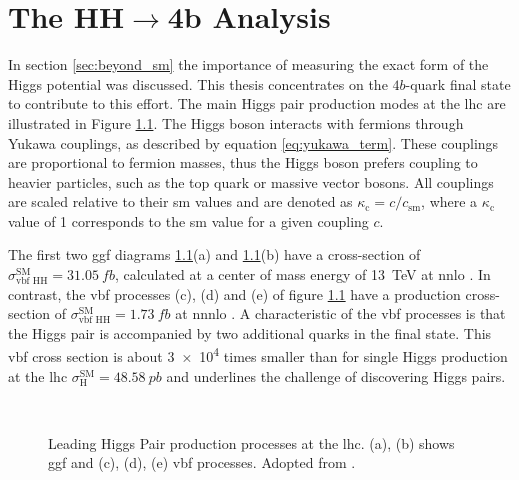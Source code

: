 \chapter{The HH$\rightarrow$4b Analysis}\label{ch:hh4b}

In section \ref{sec:beyond_sm} the importance of measuring the exact form of the Higgs potential was discussed. This thesis concentrates on the $4b$-quark final state to contribute to this effort. The main Higgs pair production modes at the \ac{lhc} are illustrated in Figure \ref{fig:main_production_processes}. The Higgs boson interacts with fermions through Yukawa couplings, as described by equation \ref{eq:yukawa_term}. These couplings are proportional to fermion masses, thus the Higgs boson prefers coupling to heavier particles, such as the top quark or massive vector bosons. All couplings are scaled relative to their \ac{sm} values and are denoted as $\kappa_\mathrm{c} = c/c_\mathrm{sm}$, where a $\kappa_\mathrm{c}$ value of 1 corresponds to the \ac{sm} value for a given coupling $c$.

The first two \ac{ggf} diagrams \ref{fig:main_production_processes}(a) and \ref{fig:main_production_processes}(b) have a cross-section of $\sigma_\text{vbf HH}^\text{SM}=\qty[]{31.05}{fb}$, calculated at a center of mass energy of \qty[]{13}{TeV} at \ac{nnlo} \citep{Grazzini_2018}. In contrast, the \ac{vbf} processes (c), (d) and (e) of figure \ref{fig:main_production_processes} have a production cross-section of
$\sigma_\text{vbf HH}^\text{SM}=\qty[]{1.73}{fb}$ at \ac{nnnlo} \citep{PhysRevD.98.114016}. A characteristic of the \ac{vbf} processes is that the Higgs pair is accompanied by two additional quarks in the final state. This \ac{vbf} cross section is about \qty[]{3e4}{} times smaller than for single Higgs production at the \ac{lhc} $\sigma_\text{H}^\text{SM}=\qty[]{48.58}{pb}$ \citep{de2016arxiv} and underlines the challenge of discovering Higgs pairs.

\begin{figure}
    \centering
    \hspace{.06\textwidth}
     \\
    \hspace{.01\textwidth}
    \hspace{.01\textwidth}
    \caption[]{Leading Higgs Pair production processes at the \ac{lhc}. (a), (b) shows \ac{ggf} and (c), (d), (e) \ac{vbf} processes. Adopted from \citep{aad2023search}.}
    \label{fig:main_production_processes}
\end{figure}

